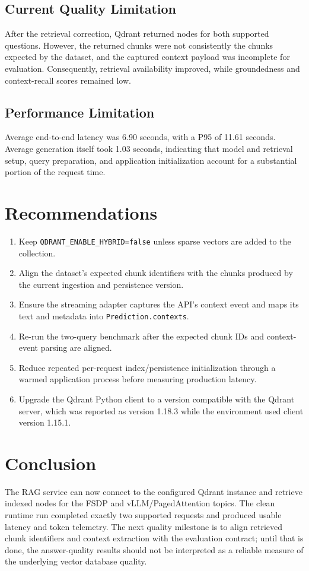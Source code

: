 \documentclass[11pt,a4paper]{article}
\begin{document}
\subsection{Current Quality Limitation}
After the retrieval correction, Qdrant returned nodes for both supported questions. However, the returned chunks were not consistently the chunks expected by the dataset, and the captured context payload was incomplete for evaluation. Consequently, retrieval availability improved, while groundedness and context-recall scores remained low.

\subsection{Performance Limitation}
Average end-to-end latency was 6.90 seconds, with a P95 of 11.61 seconds. Average generation itself took 1.03 seconds, indicating that model and retrieval setup, query preparation, and application initialization account for a substantial portion of the request time.

\section{Recommendations}

\begin{enumerate}
  \item Keep \texttt{QDRANT\_ENABLE\_HYBRID=false} unless sparse vectors are added to the collection.
  \item Align the dataset's expected chunk identifiers with the chunks produced by the current ingestion and persistence version.
  \item Ensure the streaming adapter captures the API's context event and maps its text and metadata into \texttt{Prediction.contexts}.
  \item Re-run the two-query benchmark after the expected chunk IDs and context-event parsing are aligned.
  \item Reduce repeated per-request index/persistence initialization through a warmed application process before measuring production latency.
  \item Upgrade the Qdrant Python client to a version compatible with the Qdrant server, which was reported as version 1.18.3 while the environment used client version 1.15.1.
\end{enumerate}

\section{Conclusion}

The RAG service can now connect to the configured Qdrant instance and retrieve indexed nodes for the FSDP and vLLM/PagedAttention topics. The clean runtime run completed exactly two supported requests and produced usable latency and token telemetry. The next quality milestone is to align retrieved chunk identifiers and context extraction with the evaluation contract; until that is done, the answer-quality results should not be interpreted as a reliable measure of the underlying vector database quality.
\end{document}
